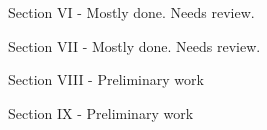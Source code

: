 \documentclass[aps,pra,10pt,twocolumn,floatfix,nofootinbib]{revtex4-1}
\numberwithin{equation}{section}
\theoremstyle{definition}
\begin{document}
Section VI - Mostly done. Needs review.

Section VII - Mostly done. Needs review.

Section VIII - Preliminary work

Section IX - Preliminary work





\end{document}
